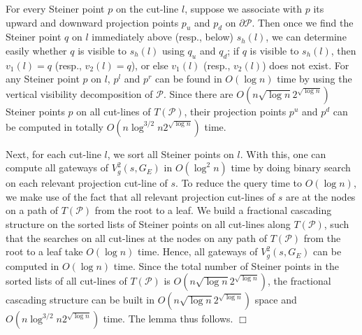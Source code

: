 \documentclass[english,runningheads,11pt]{llncs}
\def\calP{\mathcal{P}}
\newenvironment{proof}{\noindent {\textbf{Proof:}}\rm}{\hfill $\Box$\rm}
\begin{document}
\begin{proof}
For every Steiner point $p$ on the cut-line $l$, suppose we associate with $p$ its upward and
downward projection points $p_u$ and $p_d$ on $\partial\calP$. Then once we
find the Steiner point $q$ on $l$ immediately above (resp., below) $s_h(l)$, we can
determine easily whether $q$ is visible to $s_h(l)$ using $q_u$ and $q_d$; if
$q$ is visible to $s_h(l)$, then $v_1(l)=q$ (resp., $v_2(l)=q$), or else $v_1(l)$
(resp., $v_2(l)$) does not exist.
For any Steiner point $p$ on $l$, $p^l$ and $p^r$ can be found in $O(\log n)$ time by using the vertical visibility decomposition of $\calP$.
Since there are $O(n\sqrt{\log n}2^{\sqrt{\log n}})$ Steiner points $p$ on all cut-lines of $T(\calP)$,
their projection points $p^u$ and $p^d$
can be computed in totally $O(n\log^{3/2} n2^{\sqrt{\log n}})$ time.

Next, for each cut-line $l$, we sort all Steiner points on $l$. With this, one can compute all gateways of
$V_g^2(s,G_E)$ in $O(\log^2 n)$ time by doing binary search on each relevant projection cut-line of $s$.
To reduce the query time to $O(\log n)$, we make use of the fact that all relevant projection cut-lines of $s$ are at the nodes on a path of $T(\calP)$ from the root to a leaf.
We build a fractional cascading structure \cite{ref:ChazelleFr86}
on the sorted lists of Steiner points on all cut-lines along $T(\calP)$, such that the searches on all cut-lines at the nodes on any path of $T(\calP)$ from the root to a leaf take $O(\log n)$ time.
Hence, all gateways of $V_g^2(s,G_E)$ can be computed in $O(\log n)$ time. Since the total number of Steiner points
in the sorted lists of all cut-lines of $T(\calP)$ is $O(n\sqrt{\log n}2^{\sqrt{\log n}})$, the fractional cascading structure can be built in $O(n\sqrt{\log n}2^{\sqrt{\log n}})$ space and  $O(n\log^{3/2} n2^{\sqrt{\log n}})$ time.
The lemma thus follows.
\end{proof}
\end{document}

